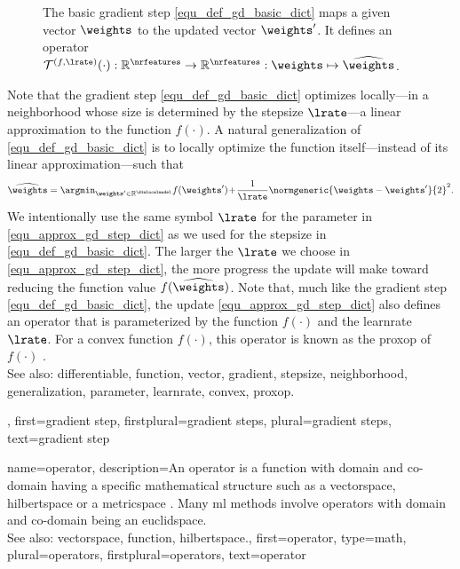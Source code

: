 {{\begin{figure}[H]
\begin{center}
\begin{tikzpicture}[scale=0.8]
				\end{tikzpicture}
			\end{center}
			\caption{The basic \gls{gradient} step \eqref{equ_def_gd_basic_dict} maps a given \gls{vector} $\weights$ 
			to the updated \gls{vector} $\weights'$. It defines an operator 
			$\mathcal{T}^{(f,\lrate)}(\cdot): \mathbb{R}^{\nrfeatures} \rightarrow \mathbb{R}^{\nrfeatures}:
			 \weights \mapsto \widehat{\weights}$.}
			\label{fig_basic_GD_step_single_dict}
		\end{figure}
		Note that the \gls{gradient} step \eqref{equ_def_gd_basic_dict} optimizes locally—in a \gls{neighborhood} whose size is 
		determined by the \gls{stepsize} $\lrate$—a linear approximation 
		to the \gls{function} $f(\cdot)$. A natural \gls{generalization} of \eqref{equ_def_gd_basic_dict} is to locally 
		optimize the \gls{function} itself—instead of its linear approximation—such that
		\begin{align} 
		\label{equ_approx_gd_step_dict}
		\widehat{\weights} = \argmin_{\weights' \in \mathbb{R}^{\dimlocalmodel}} f(\weights')\!+\!\frac{1}{\lrate}\normgeneric{\weights-\weights'}{2}^2. 
		\end{align}
		We intentionally use the same symbol $\lrate$ for the \gls{parameter} in \eqref{equ_approx_gd_step_dict} 
		as we used for the \gls{stepsize} in \eqref{equ_def_gd_basic_dict}. The larger the $\lrate$ we choose in 
		\eqref{equ_approx_gd_step_dict}, the more progress the update will make toward reducing the 
		\gls{function} value $f(\widehat{\weights})$. Note that, much like the \gls{gradient} step \eqref{equ_def_gd_basic_dict}, 
		the update \eqref{equ_approx_gd_step_dict} also defines an operator 
		that is parameterized by the \gls{function} $f(\cdot)$ and the \gls{learnrate} $\lrate$. For a \gls{convex} \gls{function}  
		$f(\cdot)$, this operator is known as the \gls{proxop} of $f(\cdot)$ \cite{ProximalMethods}. 
					\\ 
		See also: \gls{differentiable}, \gls{function}, \gls{vector}, \gls{gradient}, \gls{stepsize}, \gls{neighborhood}, \gls{generalization}, \gls{parameter}, \gls{learnrate}, \gls{convex}, \gls{proxop}.},
	first={gradient step},
	firstplural={gradient steps},
	plural={gradient steps},
	text={gradient step}
}

{name={operator}, 
	description={An operator is a \gls{function} 
	          with \gls{domain} and \gls{co-domain} having a specific 
			  mathematical structure such as a \gls{vectorspace}, \gls{hilbertspace}
			  or a \gls{metricspace} \cite{Bauschke:2017,DunfordSchwartz1988}. 
			  Many \gls{ml} methods involve operators with \gls{domain} and \gls{co-domain} 
			  being an \gls{euclidspace}.
							\\ 
		See also: \gls{vectorspace}, \gls{function}, \gls{hilbertspace}.},
	first={operator},
	type=math, 
	plural={operators},
	firstplural={operators},
	text={operator}
}

